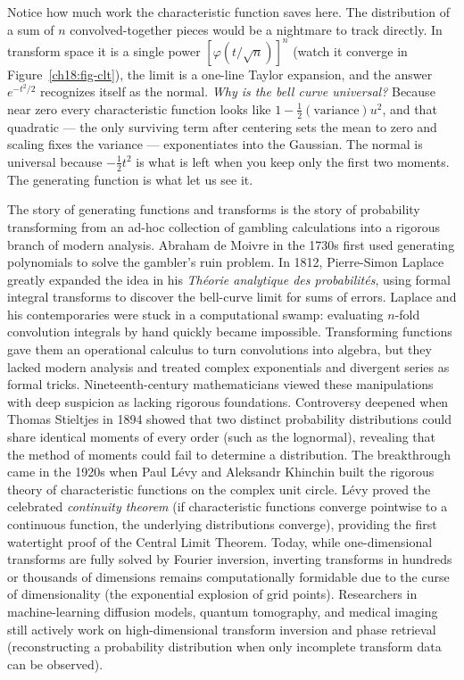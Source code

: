 Notice how much work the characteristic function saves here. The distribution of a
sum of $n$ convolved-together pieces would be a nightmare to track directly. In
transform space it is a single power $[\varphi(t/\sqrt n)]^n$ (watch it converge
in Figure~\ref{ch18:fig-clt}), the limit is a one-line Taylor expansion, and the
answer $e^{-t^2/2}$ recognizes itself as the normal. \emph{Why is the bell curve universal?} Because near zero every
characteristic function looks like $1-\frac12(\text{variance})u^2$, and that
quadratic --- the only surviving term after centering sets the mean to zero and
scaling fixes the variance --- exponentiates into the Gaussian. The normal is universal because
$-\frac12 t^2$ is what is left when you keep only the first two moments. The
generating function is what let us see it.

\begin{historybox}
The story of generating functions and transforms is the story of probability
transforming from an ad-hoc collection of gambling calculations into a rigorous
branch of modern analysis. Abraham de Moivre in the 1730s first used generating
polynomials to solve the gambler's ruin problem. In 1812, Pierre-Simon Laplace
greatly expanded the idea in his \emph{Th\'eorie analytique des probabilit\'es},
using formal integral transforms to discover the bell-curve limit for sums of
errors. Laplace and his contemporaries were stuck in a computational swamp:
evaluating $n$-fold convolution integrals by hand quickly became impossible.
Transforming functions gave them an operational calculus to turn convolutions
into algebra, but they lacked modern analysis and treated complex exponentials
and divergent series as formal tricks. Nineteenth-century mathematicians viewed
these manipulations with deep suspicion as lacking rigorous foundations. Controversy deepened
when Thomas Stieltjes in 1894 showed that two distinct probability distributions
could share identical moments of every order (such as the lognormal), revealing
that the method of moments could fail to determine a distribution. The breakthrough
came in the 1920s when Paul L\'evy and Aleksandr Khinchin built the rigorous
theory of characteristic functions on the complex unit circle. L\'evy proved
the celebrated \emph{continuity theorem} (if characteristic functions converge
pointwise to a continuous function, the underlying distributions converge),
providing the first watertight proof of the Central Limit Theorem. Today,
while one-dimensional transforms are fully solved by Fourier inversion,
inverting transforms in hundreds or thousands of dimensions remains computationally
formidable due to the curse of dimensionality (the exponential explosion of grid
points). Researchers in machine-learning diffusion models, quantum tomography,
and medical imaging still actively work on high-dimensional transform inversion
and phase retrieval (reconstructing a probability distribution when only incomplete
transform data can be observed).
\end{historybox}

